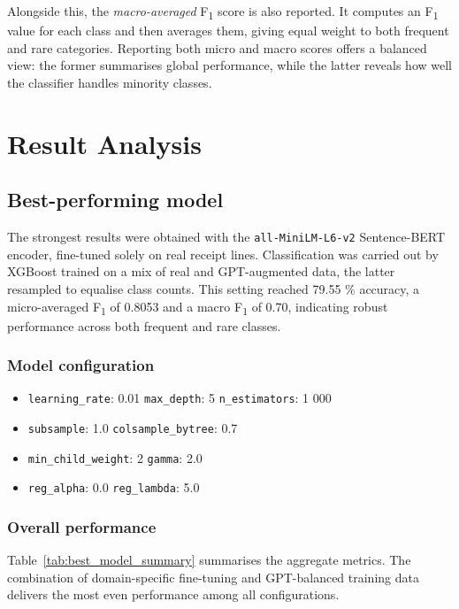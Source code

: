\documentclass{SGGW-thesis-EN}
\begin{document}
Alongside this, the \emph{macro-averaged} F\textsubscript{1} score is also reported. It computes an
F\textsubscript{1} value for each class and then averages them, giving equal weight to both frequent and rare
categories. Reporting both micro and macro scores offers a balanced view: the former summarises global performance,
while the latter reveals how well the classifier handles minority classes.


\section{Result Analysis}
\subsection{Best-performing model}
The strongest results were obtained with the \texttt{all-MiniLM-L6-v2} Sentence-BERT encoder, fine-tuned solely on real
receipt lines.
Classification was carried out by XGBoost trained on a mix of real and GPT-augmented data, the latter resampled to
equalise class counts. This setting reached 79.55 \% accuracy, a micro-averaged F\textsubscript{1} of 0.8053 and a
macro F\textsubscript{1} of 0.70, indicating robust performance across both frequent and rare classes.

\subsubsection*{Model configuration}
\begin{itemize}
  \item \texttt{learning\_rate}: 0.01 \quad \texttt{max\_depth}: 5 \quad \texttt{n\_estimators}: 1 000
  \item \texttt{subsample}: 1.0 \quad \texttt{colsample\_bytree}: 0.7
  \item \texttt{min\_child\_weight}: 2 \quad \texttt{gamma}: 2.0
  \item \texttt{reg\_alpha}: 0.0 \quad \texttt{reg\_lambda}: 5.0
\end{itemize}

\subsubsection*{Overall performance}
Table~\ref{tab:best_model_summary} summarises the aggregate metrics. The combination of domain-specific fine-tuning and
GPT-balanced training data delivers the most even performance among all configurations.
\end{document}
